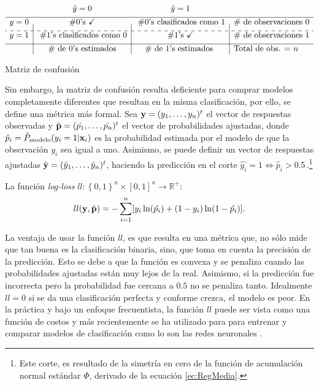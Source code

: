 \documentclass[../Main/Main.tex]{subfiles}
\begin{document}
\begin{table}[H]
\centering
$\begin{array}{c|c|c|l}
~ & \hat{y} = 0 & \hat{y} = 1 & ~ \\[4pt]
\hline
y = 0 & \#0\text{'s } \checkmark & \;\# 0\text{'s clasificados como }1 & \#\text{ de observaciones 0} \\[4pt]
\cdashline{1-4}
y = 1 & \;\# 1\text{'s clasificados como }0 & \# 1\text{'s } \checkmark & \#\text{ de observaciones 1} \\[4pt]
\hline
~ & \# \text{ de 0's estimados} & \# \text{ de 1's estimados } &  \text{Total de obs. = } n
\end{array}$
\caption{Matriz de confusión}
\label{tab:MatrizConfusion}
\end{table}

Sin embargo, la matriz de confusión resulta deficiente para comprar modelos completamente diferentes que resultan en la misma clasificación, por ello, se define una métrica más formal. Sea $\mathbf{y} = (y_1,\ldots,y_n)^t$ el vector de respuestas observadas y $\hat{\mathbf{p}} = (\hat{p_1},\ldots,\hat{p_n})^t$ el vector de probabilidades ajustadas, donde $\hat{p}_i = \hat{P}_{\text{modelo}}(y_i = 1|\mathbf{x}_i)$ es la probabilidad estimada por el modelo de que la observación $y_i$ sea igual a uno. Asimismo, se puede definir un vector de respuestas ajustadas $\hat{\mathbf{y}} = (\hat{y}_1,\ldots,\hat{y}_n)^t$, haciendo la predicción en el corte $\hat{y_i} = 1 \iff \hat{p}_i > 0.5\,$.\footnote{Este corte, es resultado de la simetría en cero de la función de acumulación normal estándar $\Phi$, derivado de la ecuación \eqref{ec:RegMedia}.}
\begin{definition}
La función \textit{log-loss} $ll:\left\{0,1\right\}^n\times[0,1]^n\rightarrow \mathbb{R}^+$:
\begin{align}
	ll(\mathbf{y},\hat{\mathbf{p}}) = -\sum_{i = 1}^n[ y_i \ln(\hat{p_i}) + (1-y_i)\ln(1-\hat{p_i})]. \label{ec:LogLoss}
\end{align}
\end{definition}
La ventaja de usar la función $ll$, es que resulta en una métrica que, no sólo mide que tan buena es la clasificación binaria, sino, que toma en cuenta la precisión de la predicción. Esto se debe a que la función es convexa y se penaliza cuando las probabilidades ajustadas están muy lejos de la real. Asimismo, si la predicción fue incorrecta pero la probabilidad fue cercana a $0.5$ no se penaliza tanto. Idealmente $ll = 0$ si se da una clasificación perfecta y conforme crezca, el modelo es peor. En la práctica y bajo un enfoque frecuentista, la función $ll$ puede ser vista como una función de costos y más recientemente se ha utilizado para para entrenar y comparar modelos de clasificación como lo son las redes neuronales \autocite{nielsen2015neural}.
\end{document}
